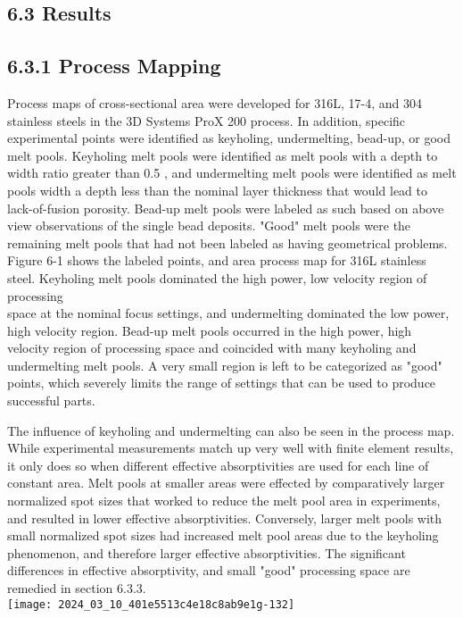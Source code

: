 \documentclass[10pt]{article}
\begin{document}
\subsection*{6.3 Results}
\subsection*{6.3.1 Process Mapping}
Process maps of cross-sectional area were developed for 316L, 17-4, and 304 stainless steels in the 3D Systems ProX 200 process. In addition, specific experimental points were identified as keyholing, undermelting, bead-up, or good melt pools. Keyholing melt pools were identified as melt pools with a depth to width ratio greater than 0.5 , and undermelting melt pools were identified as melt pools width a depth less than the nominal layer thickness that would lead to lack-of-fusion porosity. Bead-up melt pools were labeled as such based on above view observations of the single bead deposits. "Good" melt pools were the remaining melt pools that had not been labeled as having geometrical problems. Figure 6-1 shows the labeled points, and area process map for 316L stainless steel. Keyholing melt pools dominated the high power, low velocity region of processing\\
space at the nominal focus settings, and undermelting dominated the low power, high velocity region. Bead-up melt pools occurred in the high power, high velocity region of processing space and coincided with many keyholing and undermelting melt pools. A very small region is left to be categorized as "good" points, which severely limits the range of settings that can be used to produce successful parts.

The influence of keyholing and undermelting can also be seen in the process map. While experimental measurements match up very well with finite element results, it only does so when different effective absorptivities are used for each line of constant area. Melt pools at smaller areas were effected by comparatively larger normalized spot sizes that worked to reduce the melt pool area in experiments, and resulted in lower effective absorptivities. Conversely, larger melt pools with small normalized spot sizes had increased melt pool areas due to the keyholing phenomenon, and therefore larger effective absorptivities. The significant differences in effective absorptivity, and small "good" processing space are remedied in section 6.3.3.\\
\texttt{[image: 2024\_03\_10\_401e5513c4e18c8ab9e1g-132]}
\end{document}
